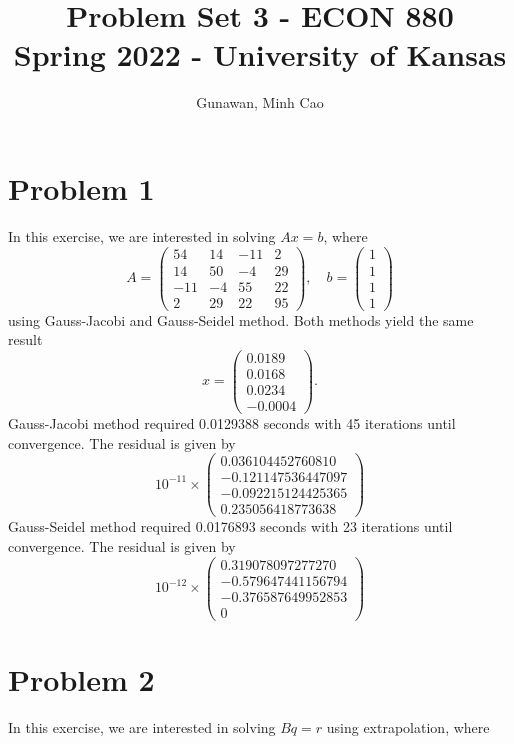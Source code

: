 \documentclass[11pt]{article}
\title{Problem Set 3 - ECON 880\\
	\small Spring 2022 - University of Kansas}
\author{Gunawan, Minh Cao}
\newcommand{\1}{\mathbbm{1}}
\begin{document}
\maketitle	

\section*{Problem 1}
In this exercise, we are interested in solving $Ax=b$, where
\[A = \begin{pmatrix}
	54 &14& -11& 2 \\ 14 &50& -4& 29 \\ -11 &-4 &55& 22 \\ 2& 29& 22& 95
\end{pmatrix}, \quad b = \begin{pmatrix}
	1\\1\\1\\1
\end{pmatrix} \]
using Gauss-Jacobi and Gauss-Seidel method. Both methods yield the same result
\[x = \begin{pmatrix}
	0.0189\\
	0.0168\\
	0.0234\\
	-0.0004
\end{pmatrix}.\]
Gauss-Jacobi method required 0.0129388 seconds with 45 iterations until convergence. The residual is given by
\[
10^{-11} \times \begin{pmatrix}
	0.036104452760810\\
	-0.121147536447097\\
	-0.092215124425365\\
	0.235056418773638
\end{pmatrix}
\]
Gauss-Seidel method required 0.0176893 seconds with 23 iterations until convergence. The residual is given by
\[10^{-12}\times \begin{pmatrix}
	0.319078097277270\\
	-0.579647441156794\\
	-0.376587649952853\\
	0
\end{pmatrix}\]
   
\section*{Problem 2}
In this exercise, we are interested in solving $Bq=r$ using extrapolation, where
\end{document}
